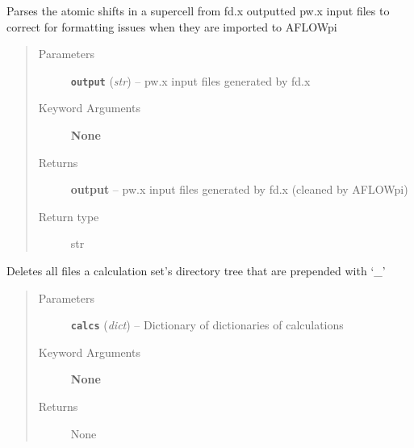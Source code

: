 \documentclass[letterpaper,10pt,english]{sphinxmanual}
\begin{document}
\begin{fulllineitems}
\label{run:run.clean_cell_params}
Parses the atomic shifts in a supercell from fd.x
outputted pw.x input files to correct for formatting
issues when they are imported to AFLOWpi
\begin{quote}\begin{description}
\item[{Parameters}] \leavevmode
\textbf{\texttt{output}} (\emph{str}) -- pw.x input files generated by fd.x

\item[{Keyword Arguments}] \leavevmode
\textbf{None}

\item[{Returns}] \leavevmode
\textbf{output} --
pw.x input files generated by fd.x (cleaned by AFLOWpi)

\item[{Return type}] \leavevmode
str

\end{description}\end{quote}

\end{fulllineitems}


\begin{fulllineitems}
\label{run:run.cleanup}
Deletes all files a calculation set's  directory
tree that are prepended with `\_'
\begin{quote}\begin{description}
\item[{Parameters}] \leavevmode
\textbf{\texttt{calcs}} (\emph{dict}) -- Dictionary of dictionaries of calculations

\item[{Keyword Arguments}] \leavevmode
\textbf{None}

\item[{Returns}] \leavevmode
None

\end{description}\end{quote}

\end{fulllineitems}

\end{document}

